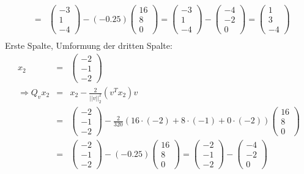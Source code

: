 \documentclass[11pt]{article} %
\begin{document}
\begin{enumerate}[a)]
\begin{eqnarray*}
&=&  \begin{pmatrix} -3 \\ 1\\ -4 \end{pmatrix} - (-0.25) \begin{pmatrix} 16 \\ 8 \\ 0 \end{pmatrix} = \begin{pmatrix} -3 \\ 1\\ -4 \end{pmatrix} - \begin{pmatrix} -4 \\ -2 \\ 0 \end{pmatrix} = \begin{pmatrix}  1 \\ 3 \\ -4 \end{pmatrix} \\
\end{eqnarray*}
Erste Spalte, Umformung der dritten Spalte:
\begin{eqnarray*}
x_2 &=& \begin{pmatrix} -2 \\ -1 \\ -2\end{pmatrix} \\
\Rightarrow Q_vx_2 &=& x_2 - \frac 2 {||v||_2^2}(v^Tx_2)v \\
&=& \begin{pmatrix} -2 \\ -1 \\ -2 \end{pmatrix} - \frac 2 {320}  (16 \cdot (-2) + 8\cdot (-1) + 0 \cdot (-2)) \begin{pmatrix} 16 \\ 8 \\ 0 \end{pmatrix} \\
&=& \begin{pmatrix} -2 \\ -1 \\ -2 \end{pmatrix} - (-0.25) \begin{pmatrix} 16 \\ 8 \\ 0 \end{pmatrix}
= \begin{pmatrix} -2 \\ -1 \\ -2 \end{pmatrix} - \begin{pmatrix} -4 \\ -2 \\ 0 \end{pmatrix}

\end{eqnarray*}
\end{enumerate}
\end{document}
